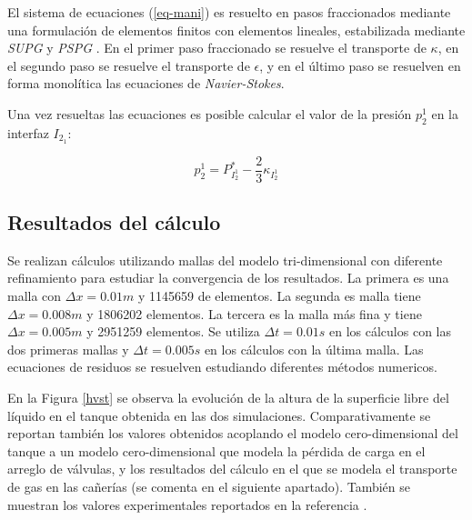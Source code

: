 El sistema de ecuaciones (\ref{eq-mani}) es resuelto en pasos fraccionados \cite{lew} mediante una formulación de elementos finitos con elementos lineales, 
estabilizada mediante \textit{SUPG} \cite{supg} y \textit{PSPG} \cite{pspg}.
En el primer paso fraccionado se resuelve el transporte de $\kappa$,
en el segundo paso se resuelve el transporte de $\epsilon$,
y en el último paso se resuelven en forma monolítica las ecuaciones de \textit{Navier-Stokes}.

Una vez resueltas las ecuaciones es posible calcular el valor de la presión $p_2^1$ en la interfaz $I_{2_1}$:

\begin{equation}
p_2^1 = P^*_{I_2^1} - \frac {2}{3} \kappa_{I_2^1}
\end{equation}

\subsection*{Resultados del cálculo}

Se realizan cálculos utilizando mallas del modelo tri-dimensional con diferente refinamiento para estudiar la convergencia de los resultados.
La primera es una malla con $\Delta x=0.01m$ y 1145659 de elementos. 
La segunda es malla tiene $\Delta x=0.008m$ y 1806202 elementos.
La tercera es la malla más fina y tiene $\Delta x=0.005m$ y 2951259 elementos.
Se utiliza $\Delta t=0.01s$ en los cálculos con las dos primeras mallas y $\Delta t=0.005s$ en los cálculos con la última malla.
Las ecuaciones de residuos se resuelven estudiando diferentes métodos numericos.


En la Figura \ref{hvst} se observa la evolución de la altura de la superficie libre del líquido en el tanque obtenida en las dos simulaciones.
Comparativamente se reportan también los valores obtenidos acoplando el modelo cero-dimensional del tanque a un modelo cero-dimensional
que modela la pérdida de carga en el arreglo de válvulas,
y los resultados del cálculo en el que se modela el transporte de gas en las cañerías (se comenta en el siguiente apartado).
También se muestran los valores experimentales reportados en la referencia \cite{invap-mockup}.

